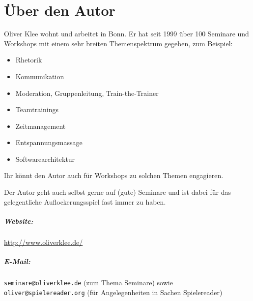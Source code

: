 \chapter{Über den Autor}
Oliver Klee wohnt und arbeitet in Bonn. Er hat seit 1999 über 100 Seminare und Workshops mit einem sehr breiten Themenspektrum gegeben, zum Beispiel:
\begin{itemize}
  \item Rhetorik
  \item Kommunikation
  \item Moderation, Gruppenleitung, Train-the-Trainer
  \item Teamtrainings
  \item Zeitmanagement
  \item Entspannungsmassage
  \item Softwarearchitektur
\end{itemize}

Ihr könnt den Autor auch für Workshops zu solchen Themen engagieren.

Der Autor geht auch selbst gerne auf (gute) Seminare und ist dabei für das gelegentliche Auflockerungsspiel fast immer zu haben.

\paragraph{Website:} \url{http://www.oliverklee.de/}
\paragraph{E-Mail:} \texttt{seminare@oliverklee.de} (zum Thema Seminare) sowie \texttt{oliver@spielereader.org} (für Angelegenheiten in Sachen Spielereader)
